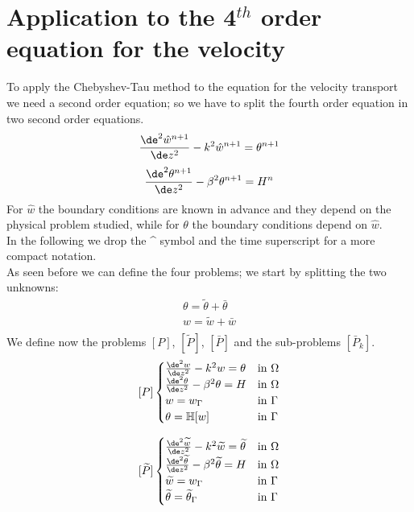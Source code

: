 \section{Application to the 4$^{th}$ order equation for the velocity}
\label{sec: infm_app}
To apply the Chebyshev-Tau method to the equation for the velocity transport we need a second order equation; so we have to split the fourth order equation in two second order equations.
\[
\frac{\de^2 \hat w^{n+1}}{\de z^2}-k^2\hat w^{n+1}=\theta^{n+1}
\]
\[
\frac{\de^2 \theta^{n+1}}{\de z^2}-\beta^2\theta^{n+1}=H^n
\]
For $\hat w$ the boundary conditions are known in advance and they depend on the physical problem studied, while for $\theta$ the boundary conditions depend on $\hat w$.\\
In the following we drop the \string^ symbol and the time superscript for a more compact notation.\\
As seen before we can define the four problems; we start by splitting the two unknowns:
\[
\begin{array}{l}
\theta=\widetilde{\theta}+\bar\theta\\
w=\widetilde{w}+\bar w\\
\end{array}
\]
We define now the problems $[P]$, $[\widetilde{P}]$, $[\bar P]$ and the sub-problems $[\bar P_k]$.
\[
[P]
\begin{cases}
\frac{\de^2 w}{\de z^2}-k^2w=\theta &\textnormal{in }\Omega\\
\frac{\de^2\theta}{\de z^2}-\beta^2 \theta=H &\textnormal{in }\Omega\\
w=w_\Gamma &\textnormal{in }\Gamma\\
\theta=\mathbb{H}[w] & \textnormal{in }\Gamma\\
\end{cases}
\]

\[
[\widetilde{P}]
\begin{cases}
\frac{\de^2 \widetilde{w}}{\de z^2}-k^2\widetilde{w}=\widetilde{\theta} &\textnormal{in }\Omega\\
\frac{\de^2\widetilde{\theta}}{\de z^2}-\beta^2\widetilde{\theta}=H &\textnormal{in }\Omega\\
\widetilde{w}=w_\Gamma &\textnormal{in }\Gamma\\
\widetilde{\theta}=\widetilde{\theta}_\Gamma & \textnormal{in }\Gamma\\
\end{cases}
\]

